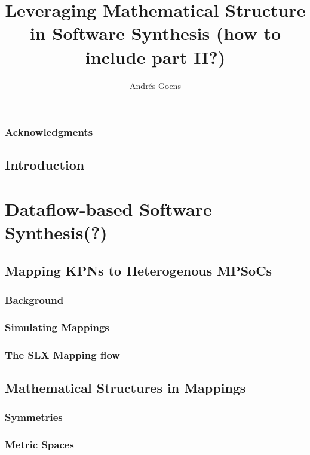 \documentclass{report}
\title{Leveraging Mathematical Structure in Software Synthesis (how to include part II?)}
\author{Andr\'{e}s Goens}
\begin{document}
\date{}

\maketitle
\tableofcontents
\clearpage
\section*{Acknowledgments}


\chapter{Introduction}


\part{Dataflow-based Software Synthesis(?)}

\chapter{Mapping KPNs to Heterogenous MPSoCs}

\section{Background}

\section{Simulating Mappings}

\section{The SLX Mapping flow}


\chapter{Mathematical Structures in Mappings}

\section{Symmetries}
\section{Metric Spaces}
\end{document}
